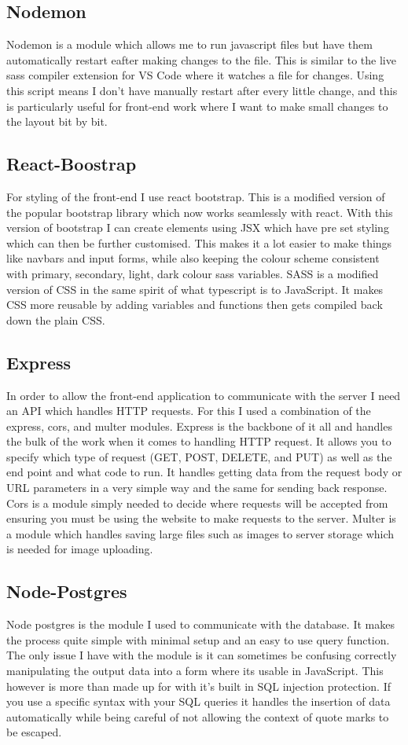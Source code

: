 \documentclass[]{final_report}
\begin{document}
\subsection{Nodemon}
Nodemon is a module which allows me to run javascript files but have them automatically restart eafter making changes to the file. This is similar to the live sass compiler extension for VS Code where it watches a file for changes. Using this script means I don't have manually restart after every little change, and this is particularly useful for front-end work where I want to make small changes to the layout bit by bit.

\subsection{React-Boostrap}
For styling of the front-end I use react bootstrap. This is a modified version of the popular bootstrap library which now works seamlessly with react. With this version of bootstrap I can create elements using JSX which have pre set styling which can then be further customised. This makes it a lot easier to make things like navbars and input forms, while also keeping the colour scheme consistent with primary, secondary, light, dark colour sass variables. SASS is a modified version of CSS in the same spirit of what typescript is to JavaScript. It makes CSS more reusable by adding variables and functions then gets compiled back down the plain CSS.

\subsection{Express}
In order to allow the front-end application to communicate with the server I need an API which handles HTTP requests. For this I used a combination of the express, cors, and multer modules. Express is the backbone of it all and handles the bulk of the work when it comes to handling HTTP request. It allows you to specify which type of request (GET, POST, DELETE, and PUT) as well as the end point and what code to run. It handles getting data from the request body or URL parameters in a very simple way and the same for sending back response. Cors is a module simply needed to decide where requests will be accepted from ensuring you must be using the website to make requests to the server. Multer is a module which handles saving large files such as images to server storage which is needed for image uploading.

\subsection{Node-Postgres}
Node postgres is the module I used to communicate with the database. It makes the process quite simple with minimal setup and an easy to use query function. The only issue I have with the module is it can sometimes be confusing correctly manipulating the output data into a form where its usable in JavaScript. This however is more than made up for with it's built in SQL injection protection. If you use a specific syntax with your SQL queries it handles the insertion of data automatically while being careful of not allowing the context of quote marks to be escaped.
\end{document}
